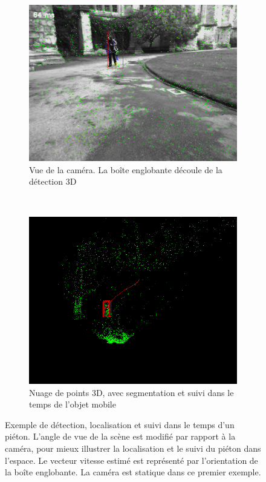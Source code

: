 \begin{figure}
	\begin{center}
		\begin{subfigure}[t]{0.48\textwidth}
			\includegraphics[width=\textwidth]{Chapter5/graphics/GMPHD_GNN_pict_3.png} 
			\caption{Vue de la caméra. La boîte englobante découle de la détection 3D}
		\end{subfigure}	
		~
		\begin{subfigure}[t]{0.48\textwidth}
			\includegraphics[width=\textwidth]{Chapter5/graphics/GMPHD_GNN_3D_3.png} 
			\caption{Nuage de points 3D, avec segmentation et suivi dans le temps de l'objet mobile}
		\end{subfigure}	
		
		\caption{Exemple de détection, localisation et suivi dans le temps d'un piéton. L'angle de vue de la scène est modifié par rapport à la caméra, pour mieux illustrer la localisation et le suivi du piéton dans l'espace. Le vecteur vitesse estimé est représenté par l'orientation de la boîte englobante. La caméra est statique dans ce premier exemple.}
		\label{fig:ch5_tracking_exemple_1}
	\end{center}
\end{figure}

